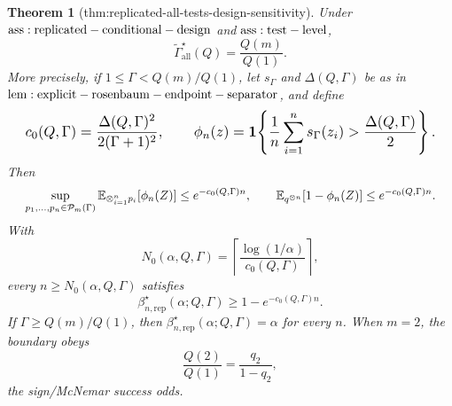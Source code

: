 \documentclass{article}
\newtheorem{theorem}{Theorem}
\begin{document}
\begin{theorem}[thm:replicated-all-tests-design-sensitivity]\label{thm:replicated-all-tests-design-sensitivity}
Under \({\rm ass:replicated-conditional-design}\) and \({\rm ass:test-level}\),
\[
 \widetilde\Gamma_{\mathrm{all}}^\star(Q)=\frac{Q(m)}{Q(1)}.
\]
More precisely, if \(1\leq\Gamma<Q(m)/Q(1)\), let \(s_\Gamma\) and \(\Delta(Q,\Gamma)\) be as in \({\rm lem:explicit-rosenbaum-endpoint-separator}\), and define
\[
\makebox[\linewidth][c]{\resizebox{0.98\linewidth}{!}{\par\noindent \makebox[\linewidth][c]{\resizebox{0.98\linewidth}{!}{\(\displaystyle \displaystyle c_0(Q,\Gamma)=\frac{\Delta(Q,\Gamma)^2}{2(\Gamma+1)^2},\qquad \phi_n(z)=\mathbf 1\!\left\{\frac1n\sum_{i=1}^ns_\Gamma(z_i)>\frac{\Delta(Q,\Gamma)}2\right\}.\)}}\par\noindent}}
\]
Then
\[
\makebox[\linewidth][c]{\resizebox{0.98\linewidth}{!}{\par\noindent \makebox[\linewidth][c]{\resizebox{0.98\linewidth}{!}{\(\displaystyle \displaystyle \sup_{p_1,\ldots,p_n\in\mathcal P_m(\Gamma)}\mathbb E_{\otimes_{i=1}^np_i}[\phi_n(Z)]\leq e^{-c_0(Q,\Gamma)n},\qquad \mathbb E_{q^{\otimes n}}[1-\phi_n(Z)]\leq e^{-c_0(Q,\Gamma)n}.\)}}\par\noindent}}
\]
With
\[
 N_0(\alpha,Q,\Gamma)=\left\lceil\frac{\log(1/\alpha)}{c_0(Q,\Gamma)}\right\rceil,
\]
every \(n\geq N_0(\alpha,Q,\Gamma)\) satisfies
\[
 \beta_{n,\mathrm{rep}}^\star(\alpha;Q,\Gamma)\geq1-e^{-c_0(Q,\Gamma)n}.
\]
If \(\Gamma\geq Q(m)/Q(1)\), then \(\beta_{n,\mathrm{rep}}^\star(\alpha;Q,\Gamma)=\alpha\) for every \(n\). When \(m=2\), the boundary obeys
\[
 \frac{Q(2)}{Q(1)}=\frac{q_2}{1-q_2},
\]
the sign/McNemar success odds.
\end{theorem}
\end{document}
